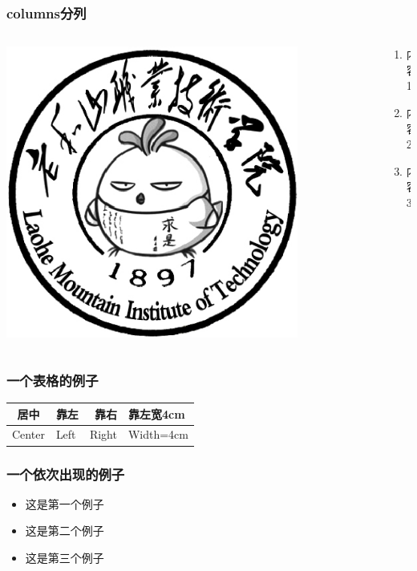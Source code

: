 \documentclass{beamer}
\begin{document}
\begin{frame}
	\frametitle{columns分列}	
	\begin{columns}
		\begin{column}{0.5\textwidth}			
			\includegraphics[width = 0.8\textwidth]{../Pictures/LHS.eps}
		\end{column}
		\begin{column}{0.5\textwidth}			
			\begin{enumerate}
				\item{}内容1
				\item{}内容2
				\item{}内容3
			\end{enumerate}			
		\end{column}
	\end{columns}	
\end{frame}
	
	\begin{frame}
		\frametitle{一个表格的例子}	
		\begin{table}[htb]
			\centering
			\begin{tabular}[t]{c|l|r|p{4cm}}
				\hline
				居中 & 靠左 & 靠右 & 靠左宽4cm\\
				\hline
				Center & Left & Right & Width=4cm\\
				\hline
			\end{tabular}
		\end{table}
	\end{frame}
	
	\begin{frame}
		\frametitle{一个依次出现的例子}	
		\begin{itemize}
			\item 这是第一个例子
			\pause
			\item 这是第二个例子
			\pause
			\item 这是第三个例子
		\end{itemize}
	\end{frame}
\end{document}
